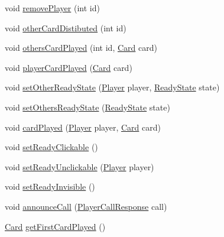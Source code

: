 \begin{DoxyCompactItemize}
\item 
void \mbox{\hyperlink{classClient_1_1Model_1_1InstanceModel_a09e3c3a7d7644c5269d8e5b584c9a05d}{remove\+Player}} (int id)
\item 
void \mbox{\hyperlink{classClient_1_1Model_1_1InstanceModel_a8671c478f5e9b1e6d61492b05e380fef}{other\+Card\+Distibuted}} (int id)
\item 
void \mbox{\hyperlink{classClient_1_1Model_1_1InstanceModel_abf0dd62b246d54aac6e708a129eabb3d}{others\+Card\+Played}} (int id, \mbox{\hyperlink{classCommon_1_1Card}{Card}} card)
\item 
void \mbox{\hyperlink{classClient_1_1Model_1_1InstanceModel_a39157358e9c27b16cee5eab48f7923a5}{player\+Card\+Played}} (\mbox{\hyperlink{classCommon_1_1Card}{Card}} card)
\item 
void \mbox{\hyperlink{classClient_1_1Model_1_1InstanceModel_af698a59ea2bd18bfc39f98b490aeda3a}{set\+Other\+Ready\+State}} (\mbox{\hyperlink{classCommon_1_1Player}{Player}} player, \mbox{\hyperlink{enumClient_1_1Model_1_1ReadyState}{Ready\+State}} state)
\item 
void \mbox{\hyperlink{classClient_1_1Model_1_1InstanceModel_ab9092b74c1a64f4788d300ca219ecce9}{set\+Others\+Ready\+State}} (\mbox{\hyperlink{enumClient_1_1Model_1_1ReadyState}{Ready\+State}} state)
\item 
void \mbox{\hyperlink{classClient_1_1Model_1_1InstanceModel_a57253fed871cdc98a72dcd2dd7770267}{card\+Played}} (\mbox{\hyperlink{classCommon_1_1Player}{Player}} player, \mbox{\hyperlink{classCommon_1_1Card}{Card}} card)
\item 
void \mbox{\hyperlink{classClient_1_1Model_1_1InstanceModel_a8d64cf17d30cf39001dc9fe8d489a214}{set\+Ready\+Clickable}} ()
\item 
void \mbox{\hyperlink{classClient_1_1Model_1_1InstanceModel_a47214f7ce49ca75c40986cac080a110e}{set\+Ready\+Unclickable}} (\mbox{\hyperlink{classCommon_1_1Player}{Player}} player)
\item 
void \mbox{\hyperlink{classClient_1_1Model_1_1InstanceModel_a424e0747d3d1de61f8ac8c3c8fd881ec}{set\+Ready\+Invisible}} ()
\item 
void \mbox{\hyperlink{classClient_1_1Model_1_1InstanceModel_aabe33dbac5182adcd97269ee5305f540}{announce\+Call}} (\mbox{\hyperlink{classCommon_1_1PlayerCallResponse}{Player\+Call\+Response}} call)
\item 
\mbox{\hyperlink{classCommon_1_1Card}{Card}} \mbox{\hyperlink{classClient_1_1Model_1_1InstanceModel_ad8571831813c7b6e51714223303a9515}{get\+First\+Card\+Played}} ()

\end{DoxyCompactItemize}
